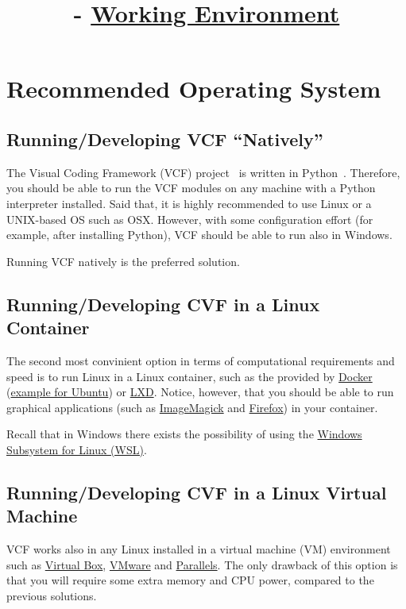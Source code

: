 

\title{\SM{} - \href{https://github.com/Sistemas-Multimedia/Sistemas-Multimedia.github.io/tree/master/contents/working_environment}{Working Environment}}

\maketitle

\tableofcontents

\section{Recommended Operating System}

\subsection{Running/Developing VCF ``Natively''}
The Visual Coding Framework (VCF) project~\cite{vruiz__VCF} is written in
Python~\cite{python}. Therefore, you should be able to run the VCF
modules on any machine with a Python interpreter installed. Said that,
it is highly recommended to use Linux or a UNIX-based OS such as
OSX. However, with some configuration effort (for example, after
installing Python), VCF should be able to run also in Windows.

Running VCF natively is the preferred solution.

\subsection{Running/Developing CVF in a Linux Container}
The second most convinient option in terms of computational
requirements and speed is to run Linux in a Linux container, such
as the provided by \href{https://hub.docker.com/}{Docker}
(\href{https://hub.docker.com/_/ubuntu}{example for Ubuntu})
or \href{https://linuxcontainers.org/}{LXD}. Notice, however, that you
should be able to run graphical applications (such
as \href{https://linuxcontainers.org/}{ImageMagick}
and \href{https://www.mozilla.org/firefox}{Firefox}) in your
container.

Recall that in Windows there exists the possibility of using the
\href{https://learn.microsoft.com/en-us/windows/wsl/install}{Windows
  Subsystem for Linux (WSL)}.

\subsection{Running/Developing CVF in a Linux Virtual Machine}
VCF works also in any Linux installed in a virtual machine (VM)
environment such as \href{https://www.virtualbox.org/}{Virtual Box},
\href{https://www.vmware.com/}{VMware} and \href{https://www.vmware.com/}{Parallels}.
The only drawback of this option is that you will require
some extra memory and CPU power, compared to the previous solutions.



